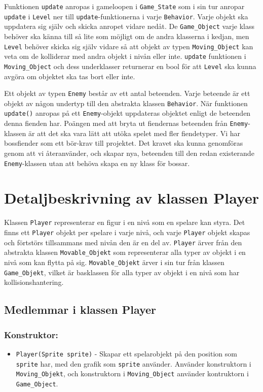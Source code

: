\documentclass{TDP005mall}
\begin{document}
Funktionen \verb|update| anropas i gameloopen i \verb|Game_State| som i sin tur anropar \verb|update| i \verb|Level| ner till \verb|update|-funktionerna i varje \verb|Behavior|. Varje objekt ska uppdatera sig själv och skicka anropet vidare nedåt. De \verb|Game_Object| varje klass behöver ska känna till så lite som möjligt om de andra klasserna i kedjan, men \verb|Level| behöver skicka sig själv vidare så att objekt av typen \verb|Moving_Object| kan veta om de kolliderar med andra objekt i nivån eller inte. \verb|update| funktionen i \verb|Moving_Object| och dess underklasser returnerar en bool för att \verb|Level| ska kunna avgöra om objektet ska tas bort eller inte.

Ett objekt av typen \verb|Enemy| består av ett antal beteenden. Varje beteende är ett objekt av någon undertyp till den abstrakta klassen \verb|Behavior|. När funktionen \verb|update()| anropas på ett \verb|Enemy|-objekt uppdateras objektet enligt de beteenden denna fienden har. Poängen med att bryta ut fiendernas beteenden från \verb|Enemy|-klassen är att det ska vara lätt att utöka spelet med fler fiendetyper. Vi har bossfiender som ett bör-krav till projektet. Det kravet ska kunna genomföras genom att vi återanvänder, och skapar nya, beteenden till den redan existerande \verb|Enemy|-klassen utan att behöva skapa en ny klass för bossar.  

\section{Detaljbeskrivning av klassen Player}
Klassen \verb|Player| representerar en figur i en nivå som en spelare kan styra. Det finns ett \verb|Player| objekt per spelare i varje nivå, och varje \verb|Player| objekt skapas och förtstörs tillsammans med nivån den är en del av. \verb|Player| ärver från den abstrakta klassen \verb|Movable_Objekt| som representerar alla typer av objekt i en nivå som kan flytta på sig. \verb|Movable_Objekt| ärver i sin tur från klassen \verb|Game_Objekt|, vilket är basklassen för alla typer av objekt i en nivå som har kollisionshantering.    

\subsection{Medlemmar i klassen Player}
\subsubsection{Konstruktor:}
\begin{itemize}
  \item  \verb|Player(Sprite sprite)| - Skapar ett spelarobjekt på den position som \verb|sprite| har, med den grafik som \verb|sprite| använder. Använder konstruktorn i \verb|Moving_Objekt|, och konstruktorn i \verb|Moving_Object| använder kontruktorn i \verb|Game_Object|.
\end{itemize}
\end{document}
